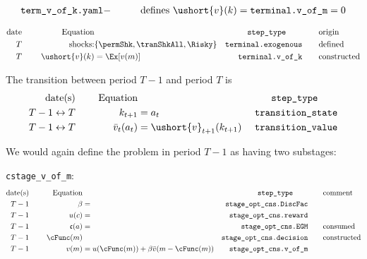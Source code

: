 \documentclass[\econtexRoot/BufferStockTheory]{subfiles}
\newcommand{\EOP}{\bar}
\newcommand{\MOP}{}
\newcommand{\BOP}{\ushort}
\begin{document}
\begin{align*}
  \texttt{term\_v\_of\_k.yaml} & - & \qquad \text{defines }\BOP{v}(k)=\texttt{terminal.v\_of\_m}=0
\end{align*}

\begin{alignat}{3}
\text{date} &      &   \notag \text{Equation} & \qquad                       & \qquad \texttt{step\_type} \qquad & \qquad \text{origin}
\\ T        & ~~~~ & \text{shocks:}           & \{\permShk,\tranShkAll,\Risky\} & \texttt{terminal.exogenous}       & \qquad \text{defined} \label{step:term_exogenous}
\\ T        & ~~~~ & \BOP{v}(k)               & = \Ex[\MOP{v}(m)]            & \texttt{terminal.v\_of\_k}        & \qquad \text{constructed} \label{step:term_expectorate}
\end{alignat}


The transition between period $T-1$ and period $T$ is
\begin{alignat}{3}
\text{date(s)}          &      &   \notag \text{Equation} & \qquad                   & \qquad \texttt{step\_type} \qquad & %
\\ T-1\leftrightarrow T & ~~~~ & k_{t+1}                  & = a_{t}                  & \texttt{transition\_state}        &  \label{step:transtate}
\\ T-1\leftrightarrow T & ~~~~ & \EOP{v}_{t}(a_{t})       & = \BOP{v}_{t+1}(k_{t+1}) & \texttt{transition\_value}        & \label{step:tranfunc}
\end{alignat}

We would again define the problem in period $T-1$ as having two substages:

\texttt{cstage\_v\_of\_m}:
\begin{alignat}{3}
\text{date(s)}              &      &   \notag \text{Equation} & \qquad                          & \qquad \texttt{step\_type} \qquad & \qquad \text{comment}
\\ T-1                    & ~~~~ & \beta                 & =                               & \texttt{stage\_opt\_cns.DiscFac}           & \label{step:discounting}
\\ T-1                    & ~~~~ &   u(c)                & =                               & \texttt{stage\_opt\_cns.reward}            & 
\\ T-1                    & ~~~~ &   \mathfrak{c}(a)     & =                               & \texttt{stage\_opt\_cns.EGM}               & \qquad \text{consumed}
\\ T-1                    & ~~~~ &   \cFunc(m)                &                                 & \texttt{stage\_opt\_cns.decision}          & \qquad \text{constructed} \label{step:cFuncMake}
\\ T-1                    & ~~~~ & \MOP{v}(m)                  & = u(\cFunc(m))+\beta \EOP{v}(m-\cFunc(m)) & \texttt{stage\_opt\_cns.v\_of\_m}          &
\end{alignat}
\end{document}
